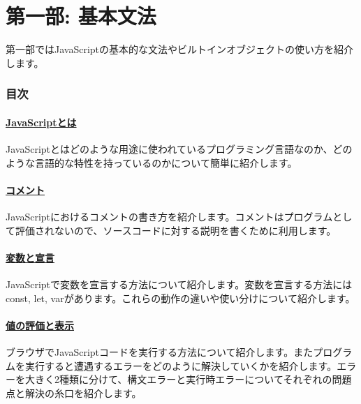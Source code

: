 \hypertarget{basic-grammar}{%
\part{第一部: 基本文法}\label{basic-grammar}}

第一部ではJavaScriptの基本的な文法やビルトインオブジェクトの使い方を紹介します。

\hypertarget{summary}{%
\section*{目次}\label{summary}}

\hypertarget{introduction}{%
\subsection*{\texorpdfstring{\href{./introduction/README.md}{JavaScriptとは}}{JavaScriptとは}}\label{introduction}}

JavaScriptとはどのような用途に使われているプログラミング言語なのか、どのような言語的な特性を持っているのかについて簡単に紹介します。

\hypertarget{comments}{%
\subsection*{\texorpdfstring{\href{./comments/README.md}{コメント}}{コメント}}\label{comments}}

JavaScriptにおけるコメントの書き方を紹介します。コメントはプログラムとして評価されないので、ソースコードに対する説明を書くために利用します。

\hypertarget{variables}{%
\subsection*{\texorpdfstring{\href{./variables/README.md}{変数と宣言}}{変数と宣言}}\label{variables}}

JavaScriptで変数を宣言する方法について紹介します。変数を宣言する方法にはconst,
let, varがあります。これらの動作の違いや使い分けについて紹介します。

\hypertarget{read-eval-print}{%
\subsection*{\texorpdfstring{\href{./read-eval-print/README.md}{値の評価と表示}}{値の評価と表示}}\label{read-eval-print}}

ブラウザでJavaScriptコードを実行する方法について紹介します。またプログラムを実行すると遭遇するエラーをどのように解決していくかを紹介します。エラーを大きく2種類に分けて、構文エラーと実行時エラーについてそれぞれの問題点と解決の糸口を紹介します。


